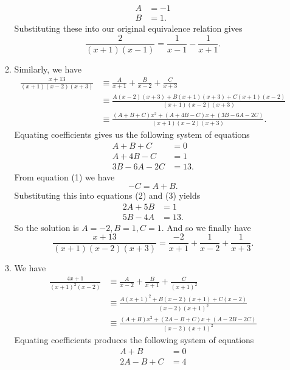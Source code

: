\documentclass[12pt,oneside]{book}
\begin{document}
\begin{enumerate}
\begin{enumerate}
\begin{align*}
                A &= -1 \\
                B &= 1.
            \end{align*}
            Substituting these into our original equivalence relation gives \[
                \frac{2}{(x+1)(x-1)} = \frac{1}{x-1}  - \frac{1}{x+1}
            .\] 
            \item Similarly, we have \begin{align*}
                \frac{x+13}{(x+1)(x-2)(x+3)} &\equiv \frac{A}{x+1} + \frac{B}{x-2} + \frac{C}{x+3} \\
                &\equiv \frac{A(x-2)(x+3) + B(x+1)(x+3) + C(x+1)(x-2)}{(x+1)(x-2)(x+3)} \\
                &\equiv \frac{(A+B+C)x^2 + (A+4B-C)x+(3B-6A-2C)}{(x+1)(x-2)(x+3)}.
            \end{align*}
            Equating coefficients gives us the following system of equations \begin{align*}
                A + B + C &= 0 \\
                A + 4B - C &= 1 \\
                3B - 6A - 2C &= 13.
            \end{align*}
            From equation (1) we have \[
                - C = A + B
		.\] Substituting this into equations (2) and (3) yields \begin{align*}
                2A + 5B &= 1 \\
                5B - 4A &= 13.
            \end{align*}
            So the solution is $A = -2, B = 1, C = 1$. And so we finally have \[
                \frac{x+13}{(x+1)(x-2)(x+3)} = \frac{-2}{x+1} + \frac{1}{x-2} + \frac{1}{x+3}
            .\] 
            \item We have \begin{align*}
                \frac{4x+1}{(x+1)^2(x-2)} &\equiv \frac{A}{x-2} + \frac{B}{x+1} + \frac{C}{(x+1)^2} \\
                &\equiv \frac{A(x+1)^2 + B(x-2)(x+1) + C(x-2)}{(x-2)(x+1)^2} \\
                &\equiv \frac{(A + B)x^2 + (2A - B + C)x + (A - 2B - 2C)}{(x-2)(x+1)^2}
            \end{align*}
            Equating coefficients produces the following system of equations \begin{align*}
                A + B &= 0 \\
                2A - B + C &= 4 \\

\end{align*}
\end{enumerate}
\end{enumerate}
\end{document}
